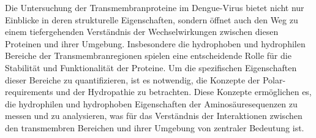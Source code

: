 \documentclass[german,version-2022-01]{uzl-thesis}
\begin{document}
Die Untersuchung der Transmembranproteine im Dengue-Virus bietet nicht nur Einblicke in deren strukturelle Eigenschaften, sondern \"offnet auch den Weg zu einem tiefergehenden Verst\"andnis der Wechselwirkungen zwischen diesen Proteinen und ihrer Umgebung. Insbesondere die hydrophoben und hydrophilen Bereiche der Transmembranregionen spielen eine entscheidende Rolle f\"ur die Stabilit\"at und Funktionalit\"at der Proteine. Um die spezifischen Eigenschaften dieser Bereiche zu quantifizieren, ist es notwendig, die Konzepte der Polar-requirements und der Hydropathie zu betrachten. Diese Konzepte erm\"oglichen es, die hydrophilen und hydrophoben Eigenschaften der Aminos\"auresequenzen zu messen und zu analysieren, was f\"ur das Verst\"andnis der Interaktionen zwischen den transmembren Bereichen und ihrer Umgebung von zentraler Bedeutung ist.
\end{document}
